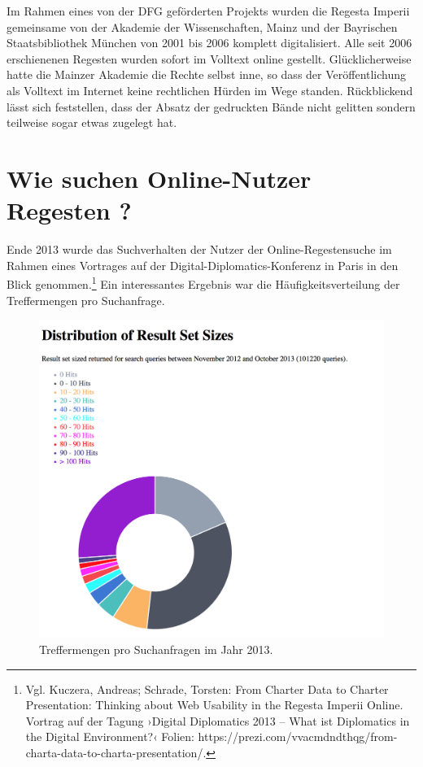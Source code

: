\documentclass[ngerman,]{scrreprt}
\begin{document}
Im Rahmen eines von der DFG geförderten Projekts wurden die Regesta Imperii gemeinsame von der Akademie der Wissenschaften, Mainz und der Bayrischen Staatsbibliothek München von 2001 bis 2006 komplett digitalisiert. Alle seit 2006 erschienenen Regesten wurden sofort im Volltext online gestellt. Glücklicherweise hatte die Mainzer Akademie die Rechte selbst inne, so dass der Veröffentlichung als Volltext im Internet keine rechtlichen Hürden im Wege standen. Rückblickend lässt sich feststellen, dass der Absatz der gedruckten Bände nicht gelitten sondern teilweise sogar etwas zugelegt hat.

\hypertarget{wie-suchen-online-nutzer-regesten}{%
\section{Wie suchen Online-Nutzer Regesten ?}\label{wie-suchen-online-nutzer-regesten}}

Ende 2013 wurde das Suchverhalten der Nutzer der Online-Regestensuche im Rahmen eines Vortrages auf der Digital-Diplomatics-Konferenz in Paris in den Blick genommen.\footnote{Vgl. Kuczera, Andreas; Schrade, Torsten: From Charter Data to Charter Presentation: Thinking about Web Usability in the Regesta Imperii Online. Vortrag auf der Tagung ›Digital Diplomatics 2013 -- What ist Diplomatics in the Digital Environment?‹ Folien: https://prezi.com/vvacmdndthqg/from-charta-data-to-charta-presentation/.} Ein interessantes Ergebnis war die Häufigkeitsverteilung der Treffermengen pro Suchanfrage.

\begin{figure}
\centering
\includegraphics{Bilder/2012-Nutzungsformen_der_RI.png}
\caption{Treffermengen pro Suchanfragen im Jahr 2013.}
\end{figure}
\end{document}
